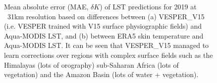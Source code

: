 \documentclass[hess, twostagejnl]{copernicus}
\begin{document}
 
 
 \begin{figure}
 	 \hspace{1mm}
 	\caption{Mean absolute error (MAE, $\delta K$) of LST predictions for 2019 at ~31km resolution based on differences between (a) VESPER\_V15 (i.e. VESPER trained with V15 surface physiographic fields) and Aqua-MODIS LST, and (b) between ERA5 skin temperature and Aqua-MODIS LST. It can be seen that VESPER\_V15 managed to learn corrections over regions with complex surface fields such as the Himalayas (lots of orography) sub-Saharan Africa (lots of vegetation) and the Amazon Basin (lots of water + vegetation). } 
 	\label{fig:example_model}
 \end{figure}
\end{document}
